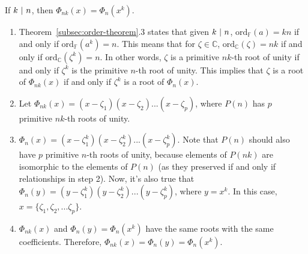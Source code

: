 \begin{tcolorbox}[title={\textbf{\tboxtheorem{\ref*{subsec:cyclotomic-theorem}.4} Formula for $\bm{\Phi_{nk}(x)}$}}]
If $k \text{ } \text{$|$} \text{ } n$, then $\Phi_{nk}(x) = \Phi_n(x^k)$.
\end{tcolorbox}
\begin{myproof}
\begin{enumerate}
    \item Theorem~\ref*{subsec:order-theorem}.3 states that given $k \text{ } \text{$|$} \text{ } n$, $\text{ord}_{\mathbb{F}}(a) = kn$ if and only if $\text{ord}_{\mathbb{F}}(a^k) = n$. This means that for $\zeta \in \mathbb{C}$, $\text{ord}_{\mathbb{C}}(\zeta) = nk$ if and only if $\text{ord}_{\mathbb{C}}(\zeta^k) = n$. In other words, $\zeta$ is a primitive $nk$-th root of unity if and only if $\zeta^k$ is the primitive $n$-th root of unity. This implies that $\zeta$ is a root of $\Phi_{nk}(x)$ if and only if $\zeta^k$ is a root of $\Phi_{n}(x)$. 
    \item Let $\Phi_{nk}(x) = (x - \zeta_1)(x - \zeta_2)...(x - \zeta_p)$, where $P(n)$ has $p$ primitive $nk$-th roots of unity.
    \item $\Phi_{n}(x) = (x - \zeta_1^k)(x - \zeta_2^k)...(x - \zeta_p^k)$. Note that $P(n)$ should also have $p$ primitive $n$-th roots of unity, because elements of $P(nk)$ are isomorphic to the elements of $P(n)$ (as they preserved if and only if relationships in step 2). Now, it's also true that $\Phi_{n}(y) = (y - \zeta_1^k)(y - \zeta_2^k)...(y - \zeta_p^k)$, where $y = x^k$. In this case, $x = \{\zeta_1, \zeta_2, ... \zeta_p\}$.
    \item $\Phi_{nk}(x)$ and $\Phi_{n}(y) = \Phi_{n}(x^k)$ have the same roots with the same coefficients. Therefore, $\Phi_{nk}(x) = \Phi_{n}(y) = \Phi_{n}(x^k)$. 
\end{enumerate}
\end{myproof}